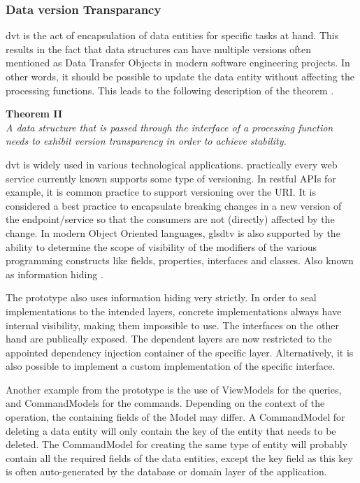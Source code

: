 \subsubsection{Data version Transparancy}

\gls{dvt} is the act of encapsulation of data entities for specific tasks at hand. This
results in the fact that data structures can have multiple versions often mentioned as
Data Transfer Objects in modern software engineering projects. In other words, it should
be possible to update the data entity without affecting the processing functions. This
leads to the following description of the theorem \parencite[280]{mannaert_normalized_2016}.

\begin{tcolorbox}
    \begin{center}
        \textbf{Theorem II}\\
        \textit{A data structure that is passed through the interface of a processing function 
        needs to exhibit version transparency in order to achieve stability.}
    \end{center}    
\end{tcolorbox}

\gls{dvt} is widely used in various technological applications. practically every web
service currently known supports some type of versioning. In restful APIs for example, it
is common practice to support versioning over the URI. It is considered a best practice
to encapsulate breaking changes in a new version of the endpoint/service so that the
consumers are not (directly) affected by the change. In modern Object Oriented languages,
gls{dtv} is also supported by the ability to determine the scope of visibility of the
modifiers of the various programming constructs like fields, properties, interfaces and
classes. Also known as information hiding
\parencites{parnas_criteria_1972}[278]{mannaert_normalized_2016}.

The prototype also uses information hiding very strictly. In order to seal implementations
to the intended layers, concrete implementations always have internal visibility, making
them impossible to use. The interfaces on the other hand are publically exposed. The
dependent layers are now restricted to the appointed dependency injection container of the
specific layer. Alternatively, it is also possible to implement a custom implementation of
the specific interface. 

Another example from the prototype is the use of ViewModels for the queries, and
CommandModels for the commands. Depending on the context of the operation, the containing
fields of the Model may differ. A CommandModel for deleting a data entity will only
contain the key of the entity that needs to be deleted. The CommandModel for creating the
same type of entity will probably contain all the required fields of the data entities,
except the key field as this key is often auto-generated by the database or
domain layer of the application.